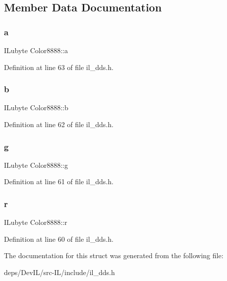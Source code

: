 \subsection{Member Data Documentation}
\mbox{\label{structColor8888_a16df9bb1b43a838effd919326842e710}} 
\subsubsection{\texorpdfstring{a}{a}}
{\footnotesize\ttfamily I\+Lubyte Color8888\+::a}



Definition at line 63 of file il\+\_\+dds.\+h.

\mbox{\label{structColor8888_a8e459f4d5454ef71dc616df58c8f2a1c}} 
\subsubsection{\texorpdfstring{b}{b}}
{\footnotesize\ttfamily I\+Lubyte Color8888\+::b}



Definition at line 62 of file il\+\_\+dds.\+h.

\mbox{\label{structColor8888_a2942c3ff04a46c7ef236ff49ab8af7f9}} 
\subsubsection{\texorpdfstring{g}{g}}
{\footnotesize\ttfamily I\+Lubyte Color8888\+::g}



Definition at line 61 of file il\+\_\+dds.\+h.

\mbox{\label{structColor8888_a4460c20173ca673cf48897c5265784fd}} 
\subsubsection{\texorpdfstring{r}{r}}
{\footnotesize\ttfamily I\+Lubyte Color8888\+::r}



Definition at line 60 of file il\+\_\+dds.\+h.



The documentation for this struct was generated from the following file\+:\begin{DoxyCompactItemize}
\item 
deps/\+Dev\+I\+L/src-\/\+I\+L/include/il\+\_\+dds.\+h\end{DoxyCompactItemize}
